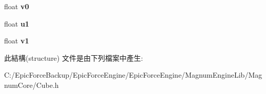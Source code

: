\begin{DoxyCompactItemize}
\item 
float {\bfseries v0}\hypertarget{struct_magnum_1_1_cube_1_1_vertex_a3b564eea561feb72cbbee00ea3861e53}{}\label{struct_magnum_1_1_cube_1_1_vertex_a3b564eea561feb72cbbee00ea3861e53}

\item 
float {\bfseries u1}\hypertarget{struct_magnum_1_1_cube_1_1_vertex_a68995c238b3f05cb704ab8dbcc424702}{}\label{struct_magnum_1_1_cube_1_1_vertex_a68995c238b3f05cb704ab8dbcc424702}

\item 
float {\bfseries v1}\hypertarget{struct_magnum_1_1_cube_1_1_vertex_a4083da530621a511ba9cda5f9d7c5ecb}{}\label{struct_magnum_1_1_cube_1_1_vertex_a4083da530621a511ba9cda5f9d7c5ecb}

\end{DoxyCompactItemize}


此結構(structure) 文件是由下列檔案中產生\+:\begin{DoxyCompactItemize}
\item 
C\+:/\+Epic\+Force\+Backup/\+Epic\+Force\+Engine/\+Epic\+Force\+Engine/\+Magnum\+Engine\+Lib/\+Magnum\+Core/Cube.\+h\end{DoxyCompactItemize}
